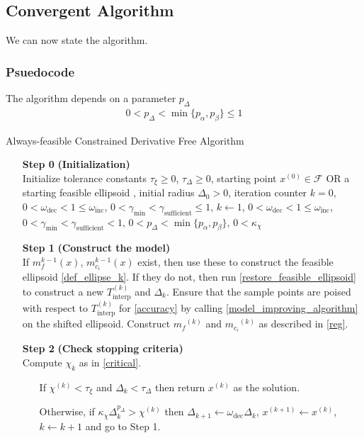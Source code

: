 \documentclass{article}
\theoremstyle{case}
\newcommand{\xk}{{x^{(k)}}}
\newcommand{\dk}{\Delta_k}
\newcommand{\mfk}{{{m}_f}^{(k)}}
\newcommand{\mcik}{{{m}_{c_i}}^{(k)}}
\newcommand{\tolcrit}{\tau_{\xi}}
\newcommand{\tolrad}{\tau_{\Delta}}
\newcommand{\sampletrk}{{T_{\text{interp}}^{(k)}}}
\newcommand{\feasible}{{\mathcal F}}
\newcommand{\chik}{{\chi^{(k)}}}
\newcommand{\omegainc}{\omega_{\text{inc}}}
\newcommand{\omegadec}{\omega_{\text{dec}}}
\newcommand{\gammasm}{\gamma_{\text{min}}}
\newcommand{\gammabi}{\gamma_{\text{sufficient}}}
\begin{document}
\subsection{Convergent Algorithm}

We can now state the algorithm.


\subsubsection{Psuedocode}

The algorithm depends on a parameter $p_{\Delta}$
\begin{align}
0 < p_{\Delta} < \min\{p_{\alpha}, p_{\beta}\} \le 1 \label{define_p_delta} 
\end{align}

\begin{algorithm}[H]
    \caption{Always-feasible Constrained Derivative Free Algorithm}
    \label{constrained_dfo}
    \begin{itemize}
        \item[\textbf{Step 0}] \textbf{(Initialization)} \\
            Initialize tolerance constants 
            $\tolcrit \ge 0$,
            $\tolrad \ge 0$,
            \color{red} starting point $x^{(0)} \in \feasible$  OR a starting feasible ellipsoid   \color{black},
            initial radius $\Delta_0 > 0$,
            iteration counter $k=0$,
            $0 < \omegadec < 1 \le \omegainc$,
            $0 < \gammasm < \gammabi \le 1$,
            $k \gets 1$,
            $0 < \omegadec < 1 \le \omegainc$,
            $0 < \gammasm < \gammabi < 1$,
            $0 < p_{\Delta} < \min\{p_{\alpha}, p_{\beta}\}$,
            $0 < \kappa_{\chi}$
            
        \item[\textbf{Step 1}] \textbf{(Construct the model)} \\
	    If $m_{f}^{k-1}(x)$, $m_{c_i}^{k-1}(x)$ exist, then use these to construct the feasible ellipsoid \cref{def_ellipse_k}.
	    If they do not, then run \cref{restore_feasible_ellipsoid} to construct a new $\sampletrk$ and $\dk$.
            Ensure that the sample points are poised with respect to $ \sampletrk $ for \cref{accuracy} by calling \cref{model_improving_algorithm} on the shifted ellipsoid.
            Construct $\mfk$ and $\mcik$ as described in \cref{reg}.
        
        \item[\textbf{Step 2}] \textbf{(Check stopping criteria)} \\
            Compute $\chi_k$ as in \cref{critical}. \begin{itemize}
                \item[] If $ \chik < \tau_{\xi} $ and $\dk <\tau_{\Delta}$ then return $\xk$ as the solution.
                \item[] Otherwise, if $\kappa_{\chi} \dk^{p_{\Delta}} > \chik$ then 
                $\Delta_{k+1} \gets \omegadec\dk$, 
                $x^{(k+1)} \gets \xk$,
                $k \gets k+1$ and go to Step 1.
            \end{itemize}
        

\end{itemize}
\end{algorithm}
\end{document}
